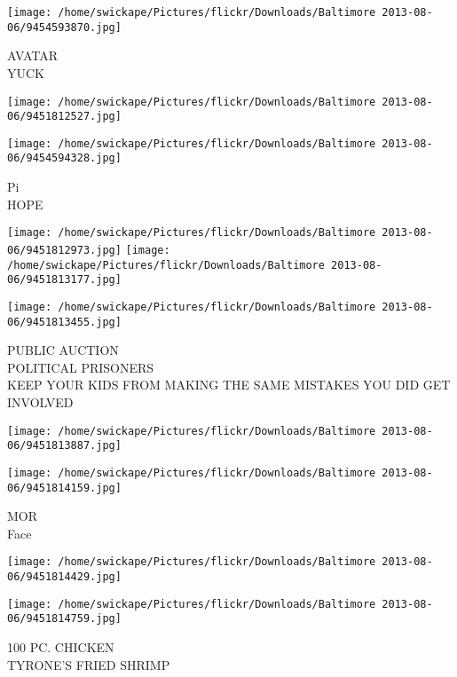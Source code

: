 \documentclass[10pt,letterpaper]{article}
\begin{document}
\vspace{0.25in}
\texttt{[image: /home/swickape/Pictures/flickr/Downloads/Baltimore 2013-08-06/9454593870.jpg]}

AVATAR\\
YUCK\\
\pagebreak

\texttt{[image: /home/swickape/Pictures/flickr/Downloads/Baltimore 2013-08-06/9451812527.jpg]}

\vspace{0.25in}
\texttt{[image: /home/swickape/Pictures/flickr/Downloads/Baltimore 2013-08-06/9454594328.jpg]}

Pi\\
HOPE\\
\pagebreak

\texttt{[image: /home/swickape/Pictures/flickr/Downloads/Baltimore 2013-08-06/9451812973.jpg]}
\texttt{[image: /home/swickape/Pictures/flickr/Downloads/Baltimore 2013-08-06/9451813177.jpg]}

\texttt{[image: /home/swickape/Pictures/flickr/Downloads/Baltimore 2013-08-06/9451813455.jpg]}

PUBLIC AUCTION\\
POLITICAL PRISONERS\\
KEEP YOUR KIDS FROM MAKING THE SAME MISTAKES YOU DID GET INVOLVED\\
\pagebreak

\texttt{[image: /home/swickape/Pictures/flickr/Downloads/Baltimore 2013-08-06/9451813887.jpg]}

\vspace{0.25in}
\texttt{[image: /home/swickape/Pictures/flickr/Downloads/Baltimore 2013-08-06/9451814159.jpg]}

MOR\\
Face\\
\pagebreak

\texttt{[image: /home/swickape/Pictures/flickr/Downloads/Baltimore 2013-08-06/9451814429.jpg]}

\vspace{0.25in}
\texttt{[image: /home/swickape/Pictures/flickr/Downloads/Baltimore 2013-08-06/9451814759.jpg]}

100 PC. CHICKEN\\
TYRONE'S FRIED SHRIMP\\
\pagebreak
\end{document}
